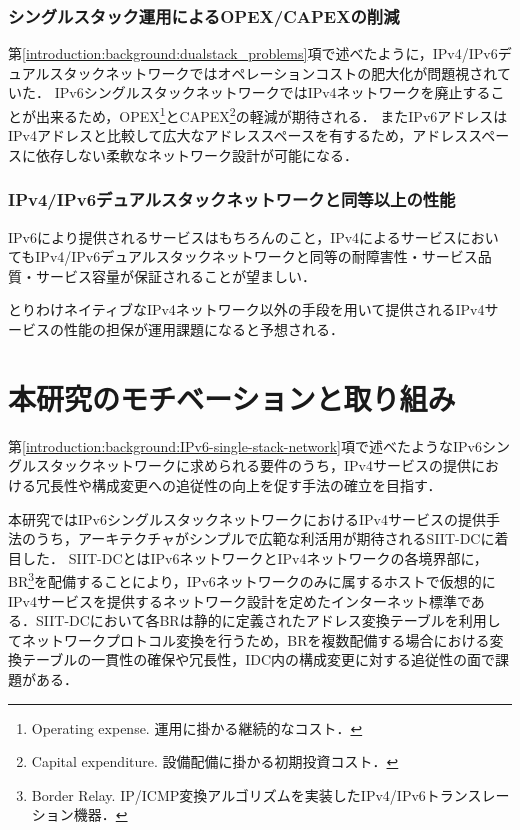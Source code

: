 \subsubsection{シングルスタック運用によるOPEX/CAPEXの削減}
第\ref{introduction:background:dualstack_problems}項で述べたように，IPv4/IPv6デュアルスタックネットワークではオペレーションコストの肥大化が問題視されていた．
IPv6シングルスタックネットワークではIPv4ネットワークを廃止することが出来るため，OPEX\footnote{Operating expense. 運用に掛かる継続的なコスト．}とCAPEX\footnote{Capital expenditure. 設備配備に掛かる初期投資コスト．}の軽減が期待される．
またIPv6アドレスはIPv4アドレスと比較して広大なアドレススペースを有するため，アドレススペースに依存しない柔軟なネットワーク設計が可能になる．

\subsubsection{IPv4/IPv6デュアルスタックネットワークと同等以上の性能}
IPv6により提供されるサービスはもちろんのこと，IPv4によるサービスにおいてもIPv4/IPv6デュアルスタックネットワークと同等の耐障害性・サービス品質・サービス容量が保証されることが望ましい．

とりわけネイティブなIPv4ネットワーク以外の手段を用いて提供されるIPv4サービスの性能の担保が運用課題になると予想される．




\section{本研究のモチベーションと取り組み}

第\ref{introduction:background:IPv6-single-stack-network}項で述べたようなIPv6シングルスタックネットワークに求められる要件のうち，IPv4サービスの提供における冗長性や構成変更への追従性の向上を促す手法の確立を目指す．

本研究ではIPv6シングルスタックネットワークにおけるIPv4サービスの提供手法のうち，アーキテクチャがシンプルで広範な利活用が期待されるSIIT-DC\cite{RFC7755}に着目した．
SIIT-DCとはIPv6ネットワークとIPv4ネットワークの各境界部に，BR\footnote{Border Relay. IP/ICMP変換アルゴリズム\cite{RFC7915}を実装したIPv4/IPv6トランスレーション機器．}を配備することにより，IPv6ネットワークのみに属するホストで仮想的にIPv4サービスを提供するネットワーク設計を定めたインターネット標準である．SIIT-DCにおいて各BRは静的に定義されたアドレス変換テーブルを利用してネットワークプロトコル変換を行うため，BRを複数配備する場合における変換テーブルの一貫性の確保や冗長性，IDC内の構成変更に対する追従性の面で課題がある．

